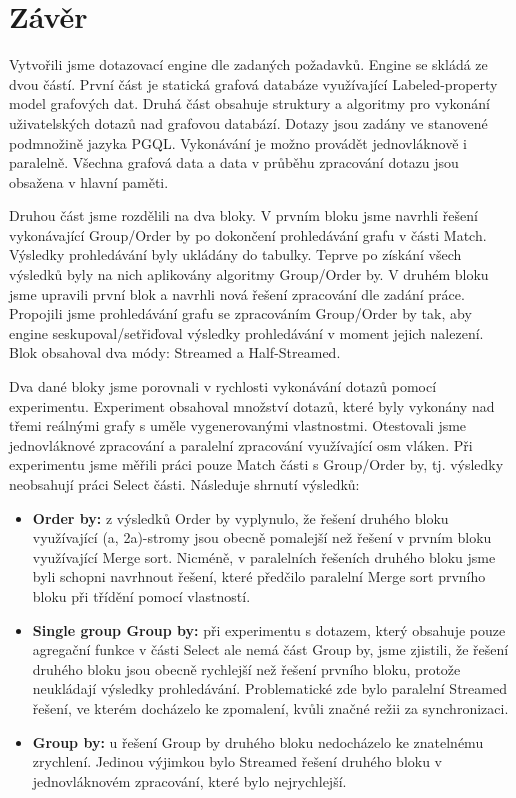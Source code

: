 \chapter{Závěr}

Vytvořili jsme dotazovací engine dle zadaných požadavků.
Engine se skládá ze dvou částí.
První část je statická grafová databáze využívající Labeled-property model grafových dat. 
Druhá část obsahuje struktury a algoritmy pro vykonání uživatelských dotazů nad grafovou databází.
Dotazy jsou zadány ve stanovené podmnožině jazyka PGQL.
Vykonávání je možno provádět jednovláknově i paralelně.
Všechna grafová data a data v průběhu zpracování dotazu jsou obsažena v hlavní paměti.

Druhou část jsme rozdělili na dva bloky.
V prvním bloku jsme navrhli řešení vykonávající Group/Order by po dokončení prohledávání grafu v části Match.
Výsledky prohledávání byly ukládány do tabulky.
Teprve po získání všech výsledků byly na nich aplikovány algoritmy Group/Order by. 
V druhém bloku jsme upravili první blok a navrhli nová řešení zpracování dle zadání práce.
Propojili jsme prohledávání grafu se zpracováním Group/Order by tak, aby engine seskupoval/setřiďoval výsledky prohledávání v moment jejich nalezení.
Blok obsahoval dva módy: Streamed a Half-Streamed.

Dva dané bloky jsme porovnali v rychlosti vykonávání dotazů pomocí experimentu.
Experiment obsahoval množství dotazů, které byly vykonány nad třemi reálnými grafy s uměle vygenerovanými vlastnostmi.
Otestovali jsme jednovláknové zpracování a paralelní zpracování využívající osm vláken.
Při experimentu jsme měřili práci pouze Match části s Group/Order by, tj. výsledky neobsahují práci Select části.
Následuje shrnutí výsledků:
\begin{itemize}

\item \textbf{Order by:} z výsledků Order by vyplynulo, že řešení druhého bloku využívající (a, 2a)-stromy jsou obecně pomalejší než řešení v prvním bloku využívající Merge sort.
Nicméně, v paralelních řešeních druhého bloku jsme byli schopni navrhnout řešení, které předčilo paralelní Merge sort prvního bloku při třídění pomocí vlastností.

\item \textbf{Single group Group by:} při experimentu s dotazem, který obsahuje pouze agregační funkce v části Select ale nemá část Group by, jsme zjistili, že řešení druhého bloku jsou obecně rychlejší než řešení prvního bloku, protože neukládají výsledky prohledávání. 
Problematické zde bylo paralelní Streamed řešení, ve kterém docházelo ke zpomalení, kvůli značné režii za synchronizaci.

\item \textbf{Group by:} u řešení Group by druhého bloku nedocházelo ke znatelnému zrychlení.
Jedinou výjimkou bylo Streamed řešení druhého bloku v jednovláknovém zpracování, které bylo nejrychlejší.

\end{itemize}

